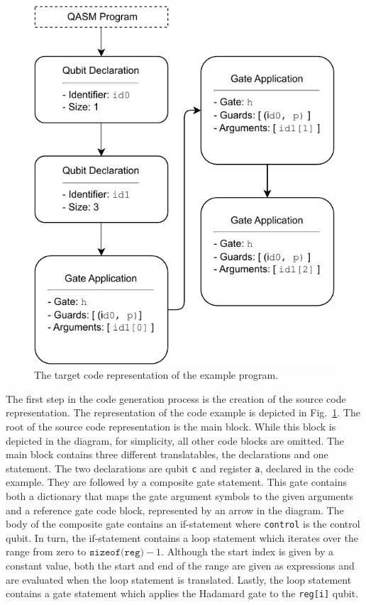 \begin{figure}
\begin{minipage}{.45\textwidth}
        \includegraphics[width=\textwidth]{../figures/drawio/codeGen_targetCode_example.pdf}
        \caption{The target code representation of the example program.}    
        \label{fig:implementation_targetCodeRep_example}
    \end{minipage}
\end{figure}

The first step in the code generation process is the creation of the source code representation. The representation of the code example is depicted in Fig.~\ref{fig:implementation_targetCodeRep_example}. The root of the source code representation is the main block. While this block is depicted in the diagram, for simplicity, all other code blocks are omitted. The main block contains three different translatables, the declarations and one statement. The two declarations are qubit \texttt{c} and register \texttt{a}, declared in the code example. They are followed by a composite gate statement. This gate contains both a dictionary that maps the gate argument symbols to the given arguments and a reference gate code block, represented by an arrow in the diagram. The body of the composite gate contains an if-statement where \texttt{control} is the control qubit. In turn, the if-statement contains a loop statement which iterates over the range from zero to $\texttt{sizeof(reg)} - 1$. Although the start index is given by a constant value, both the start and end of the range are given as expressions and are evaluated when the loop statement is translated. Lastly, the loop statement contains a gate statement which applies the Hadamard gate to the \texttt{reg[i]} qubit.

